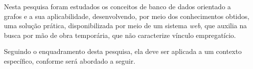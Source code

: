 \par Nesta pesquisa foram estudados os conceitos de banco de dados orientado a grafos e a sua aplicabilidade, desenvolvendo, por meio dos conhecimentos obtidos, uma solução prática, disponibilizada por meio de um sistema \textit{web}, que auxilia na busca por mão de obra temporária, que não caracterize vínculo empregatício.

\par Seguindo o enquadramento desta pesquisa, ela deve ser aplicada a um contexto específico, conforme será abordado a seguir. 




